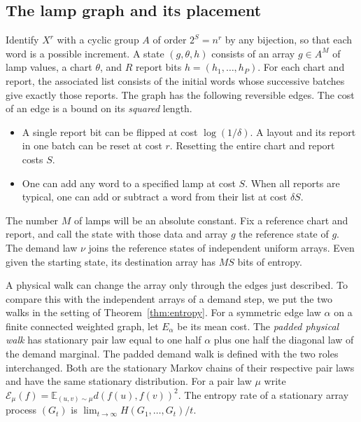 \subsection{The lamp graph and its placement}

Identify \(X^r\) with a cyclic group \(A\) of order \(2^S=n^r\)
by any bijection, so that each word is a possible increment. A state
\((g,\theta,h)\) consists of an array \(g\in A^M\) of lamp values, a
chart \(\theta\), and \(R\) report bits \(h=(h_1,\ldots,h_P)\). For
each chart and report, the associated list consists of the initial words
whose successive batches give exactly those reports. The graph has the
following reversible edges. The cost of an edge is a bound on its
\emph{squared} length.
\begin{itemize}
\item A single report bit can be flipped at cost \(\log(1/\delta)\).
A layout and its report in one batch can be reset at cost \(r\).
Resetting the entire chart and report costs \(S\).
\item One can add any word to a specified lamp at cost \(S\).
When all reports are typical, one can add or subtract a word from
their list at cost \(\delta S\).
\end{itemize}
The number \(M\) of lamps will be an absolute constant. Fix a reference
chart and report, and call the state with those data and array \(g\)
the reference state of \(g\). The demand law \(\nu\) joins the
reference states of independent uniform arrays. Even given the
starting state, its destination array has \(MS\) bits of entropy.

A physical walk can change the array only through the edges just
described. To compare this with the independent arrays of a demand
step, we put the two walks in the setting of Theorem~\ref{thm:entropy}.
For a symmetric edge law \(\alpha\) on a finite connected weighted
graph, let \(E_\alpha\) be its mean cost.
The \emph{padded physical walk} has stationary pair law equal to
one half \(\alpha\) plus one half the diagonal law of the demand marginal.
The padded demand walk is defined with the two roles interchanged.
Both are the stationary Markov chains of their respective pair laws
and have the same stationary distribution. For a pair law \(\mu\) write
\(\mathcal E_\mu(f)=\mathbb E_{(u,v)\sim\mu}d(f(u),f(v))^2\).
The entropy rate of a stationary array process \((G_t)\) is
\(\lim_{t\to\infty}H(G_1,\ldots,G_t)/t\).

